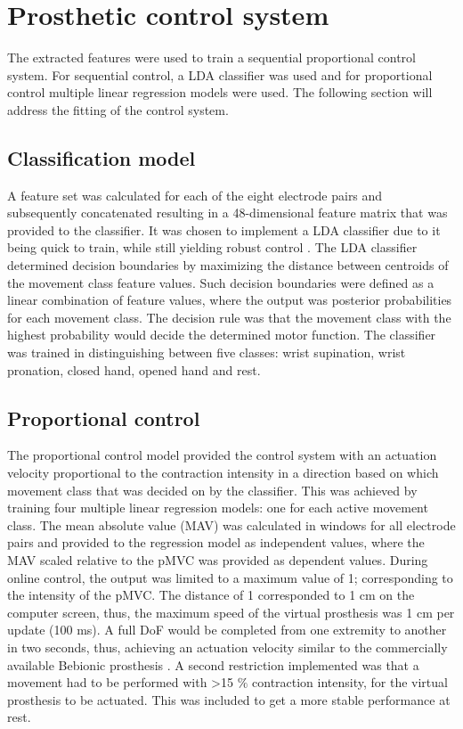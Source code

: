 \section{Prosthetic control system}
The extracted features were used to train a sequential proportional control system. For sequential control, a LDA classifier was used and for proportional control multiple linear regression models were used. The following section will address the fitting of the control system. 

\subsection{Classification model}
A feature set was calculated for each of the eight electrode pairs and subsequently concatenated resulting in a 48-dimensional feature matrix that was provided to the classifier. It was chosen to implement a LDA classifier due to it being quick to train, while still yielding robust control \cite{Englehart2003}. The LDA classifier determined decision boundaries by maximizing the distance between centroids of the movement class feature values. Such decision boundaries were defined as a linear combination of feature values, where the output was posterior probabilities for each movement class. The decision rule was that the movement class with the highest probability would decide the determined motor function. The classifier was trained in distinguishing between five classes: wrist supination, wrist pronation, closed hand, opened hand and rest.  

\subsection{Proportional control}
The proportional control model provided the control system with an actuation velocity proportional to the contraction intensity in a direction based on which movement class that was decided on by the classifier. This was achieved by training four multiple linear regression models: one for each active movement class. The mean absolute value (MAV) was calculated in windows for all electrode pairs and provided to the regression model as independent values, where the MAV scaled relative to the pMVC was provided as dependent values. During online control, the output was limited to a maximum value of 1; corresponding to the intensity of the pMVC. The distance of 1 corresponded to 1 cm on the computer screen, thus, the maximum speed of the virtual prosthesis was 1 cm per update (100 ms). A full DoF would be completed from one extremity to another in two seconds, thus, achieving an actuation velocity similar to the commercially available Bebionic prosthesis \cite{Belter2013}. A second restriction implemented was that a movement had to be performed with >15 $\percent$ contraction intensity, for the virtual prosthesis to be actuated. This was included to get a more stable performance at rest. 